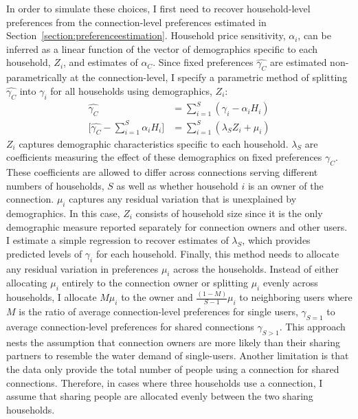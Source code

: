 \documentclass[12pt]{article}
\begin{document}
In order to simulate these choices, I first need to recover household-level preferences from the connection-level preferences estimated in Section~\ref{section:preferenceestimation}.  Household price sensitivity, $\alpha_i$, can be inferred as a linear function of the vector of demographics specific to each household, $Z_i$, and estimates of $\alpha_C$.  Since fixed preferences $\hat{\gamma_C}$ are estimated non-parametrically at the connection-level, I specify a parametric method of splitting $\hat{\gamma_C}$ into $\gamma_i$ for all households using demographics, $Z_i$:
\begin{align*}
\hat{\gamma_C}  		   		& =  \sum_{i=1}^{S} ( \gamma_i - \alpha_i H_{i} ) \\
\big [ \hat{\gamma_C} - \sum_{i=1}^{S}  \alpha_i H_{i} \big ]		& =  \sum_{i=1}^{S}  (\lambda_{S} Z_i + \mu_{i})  
\end{align*}
$Z_i$ captures demographic characteristics specific to each household.  $\lambda_{S}$ are coefficients measuring the effect of these demographics on fixed preferences $\gamma_C$.  These coefficients are allowed to differ across connections serving different numbers of households, $S$ as well as whether household $i$ is an owner of the connection.  $\mu_{i}$ captures any residual variation that is unexplained by demographics.  In this case, $Z_i$ consists of household size since it is the only demographic measure reported separately for connection owners and other users.  I estimate a simple regression to recover estimates of $\lambda_{S}$, which provides predicted levels of $\gamma_i$ for each household.  Finally, this method needs to allocate any residual variation in preferences $\mu_{i}$ across the households.  Instead of either allocating $\mu_i$ entirely to the connection owner or splitting $\mu_{i}$ evenly across households, I allocate $M \mu_{i}$ to the owner and $\frac{(1-M)}{S-1} \mu_{i}$ to neighboring users where $M$ is the ratio of average connection-level preferences for single users, $\gamma_{S=1}$ to average connection-level preferences for shared connections $\gamma_{S>1}$.  This approach nests the assumption that connection owners are more likely than their sharing partners to resemble the water demand of single-users.  Another limitation is that the data only provide the total number of people using a connection for shared connections.  Therefore, in cases where three households use a connection, I assume that sharing people are allocated evenly between the two sharing households.
\end{document}
